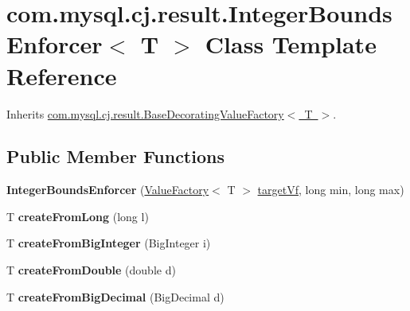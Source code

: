 \hypertarget{classcom_1_1mysql_1_1cj_1_1result_1_1_integer_bounds_enforcer}{}\section{com.\+mysql.\+cj.\+result.\+Integer\+Bounds\+Enforcer$<$ T $>$ Class Template Reference}
\label{classcom_1_1mysql_1_1cj_1_1result_1_1_integer_bounds_enforcer}


Inherits \mbox{\hyperlink{classcom_1_1mysql_1_1cj_1_1result_1_1_base_decorating_value_factory}{com.\+mysql.\+cj.\+result.\+Base\+Decorating\+Value\+Factory$<$ T $>$}}.

\subsection*{Public Member Functions}
\begin{DoxyCompactItemize}
\item 
\mbox{\label{classcom_1_1mysql_1_1cj_1_1result_1_1_integer_bounds_enforcer_ad0d5333449e0fe420770afb261b141a7}} 
{\bfseries Integer\+Bounds\+Enforcer} (\mbox{\hyperlink{interfacecom_1_1mysql_1_1cj_1_1result_1_1_value_factory}{Value\+Factory}}$<$ T $>$ \mbox{\hyperlink{classcom_1_1mysql_1_1cj_1_1result_1_1_base_decorating_value_factory_a64c2c62bd9906ec3af7fc62e58bf34b3}{target\+Vf}}, long min, long max)
\item 
\mbox{\label{classcom_1_1mysql_1_1cj_1_1result_1_1_integer_bounds_enforcer_a7c096b3f99fcd5043d9fba39c621eec2}} 
T {\bfseries create\+From\+Long} (long l)
\item 
\mbox{\label{classcom_1_1mysql_1_1cj_1_1result_1_1_integer_bounds_enforcer_a9f1986170774f7cd6d33fb0209863b60}} 
T {\bfseries create\+From\+Big\+Integer} (Big\+Integer i)
\item 
\mbox{\label{classcom_1_1mysql_1_1cj_1_1result_1_1_integer_bounds_enforcer_af5d807e10e726b20661c10addd2261f2}} 
T {\bfseries create\+From\+Double} (double d)
\item 
\mbox{\label{classcom_1_1mysql_1_1cj_1_1result_1_1_integer_bounds_enforcer_aefe5924797f489f611e7f40638c5e3d2}} 
T {\bfseries create\+From\+Big\+Decimal} (Big\+Decimal d)
\end{DoxyCompactItemize}
